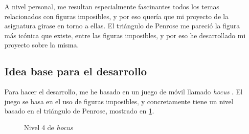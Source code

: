 \documentclass[a4paper,12pt]{article}
\begin{document}
A nivel personal, me resultan especialmente fascinantes todos los temas relacionados con figuras imposibles, y por eso quería que mi proyecto de la asignatura girase en torno a ellas. El triángulo de Penrose me pareció la figura más icónica que existe, entre las figuras imposibles, y por eso he desarrollado mi proyecto sobre la misma.

\subsection{Idea base para el desarrollo}

Para hacer el desarrollo, me he basado en un juego de móvil llamado \textit{hocus} \cite{hocus}. El juego se basa en el uso de figuras imposibles, y concretamente tiene un nivel basado en el triángulo de Penrose, mostrado en \ref{nivel_hocus}.

\begin{figure}
    \centering
    \caption{Nivel 4 de \textit{hocus}} \label{nivel_hocus}
\end{figure}
\end{document}
